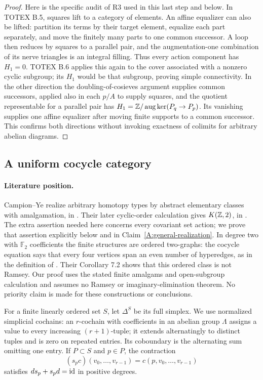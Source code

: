 \begin{proof}
Here is the specific audit of R3 used in this last step and below. In TOTEX B.5, squares lift to a category of elements. An affine equalizer can also be lifted: partition its terms by their target element, equalize each part separately, and move the finitely many parts to one common successor. A loop then reduces by squares to a parallel pair, and the augmentation-one combination of its nerve triangles is an integral filling. Thus every action component has $H_1=0$. TOTEX B.6 applies this again to the cover associated with a nonzero cyclic subgroup; its $H_1$ would be that subgroup, proving simple connectivity. In the other direction the doubling-of-cosieves argument supplies common successors, applied also in each $p/A$ to supply squares, and the quotient representable for a parallel pair has $H_1=\mathbb Z/\operatorname{aug}\ker(P_q\to P_p)$. Its vanishing supplies one affine equalizer after moving finite supports to a common successor. This confirms both directions without invoking exactness of colimits for arbitrary abelian diagrams.
\end{proof}

\subsection{A uniform cocycle category}

\paragraph{Literature position.}
Campion--Ye realize arbitrary homotopy types by abstract elementary classes with amalgamation, in \cite[Theorem 3.6 and Corollary 3.7]{CampionYeAEC2020}. Their later cyclic-order calculation gives $K(\mathbb Z,2)$, in \cite[Corollaries 1.13--1.14 and 2.8]{CampionYeHigher2026}. The extra assertion needed here concerns every covariant set action; we prove that assertion explicitly below and in Claim~\ref{A:general-realization}. In degree two with $\mathbb F_2$ coefficients the finite structures are ordered two-graphs: the cocycle equation says that every four vertices span an even number of hyperedges, as in the definition of \cite{EvansHubickaKonecnyNesetril2020}. Their Corollary 7.2 shows that this ordered class is not Ramsey. Our proof uses the stated finite amalgams and open-subgroup calculation and assumes no Ramsey or imaginary-elimination theorem. No priority claim is made for these constructions or conclusions.

For a finite linearly ordered set $S$, let $\Delta^S$ be its full simplex. We use normalized simplicial cochains: an $r$-cochain with coefficients in an abelian group $\Lambda$ assigns a value to every increasing $(r+1)$-tuple; it extends alternatingly to distinct tuples and is zero on repeated entries. Its coboundary is the alternating sum omitting one entry. If $P\subset S$ and $p\in P$, the contraction
\[
 (s_pc)(v_0,\ldots,v_{r-1})=c(p,v_0,\ldots,v_{r-1})
\]
satisfies $d s_p+s_p d=\mathrm{id}$ in positive degrees.


